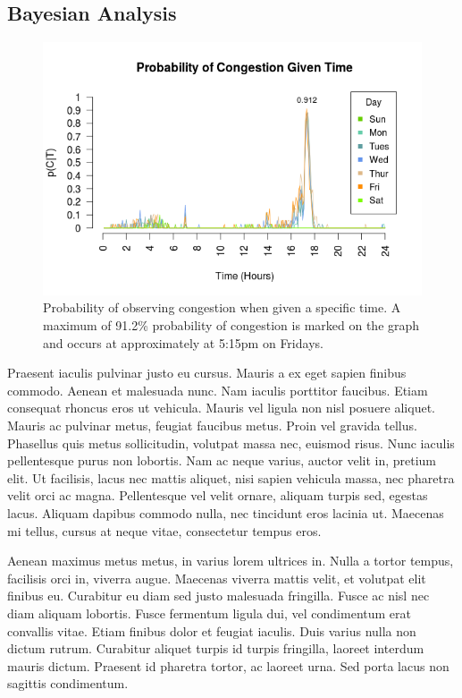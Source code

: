 \documentclass{report}
\begin{document}
\subsection*{Bayesian Analysis}

\begin{figure}
  \centering
	\includegraphics{pCTplot.png}
	\caption{Probability of observing congestion when given a specific time. A maximum of 91.2\% probability of congestion is marked on the graph and occurs at approximately at 5:15pm on Fridays.}
\end{figure}

Praesent iaculis pulvinar justo eu cursus. Mauris a ex eget sapien finibus commodo. Aenean et malesuada nunc. Nam iaculis porttitor faucibus. Etiam consequat rhoncus eros ut vehicula. Mauris vel ligula non nisl posuere aliquet. Mauris ac pulvinar metus, feugiat faucibus metus. Proin vel gravida tellus. Phasellus quis metus sollicitudin, volutpat massa nec, euismod risus. Nunc iaculis pellentesque purus non lobortis. Nam ac neque varius, auctor velit in, pretium elit. Ut facilisis, lacus nec mattis aliquet, nisi sapien vehicula massa, nec pharetra velit orci ac magna. Pellentesque vel velit ornare, aliquam turpis sed, egestas lacus. Aliquam dapibus commodo nulla, nec tincidunt eros lacinia ut. Maecenas mi tellus, cursus at neque vitae, consectetur tempus eros.

Aenean maximus metus metus, in varius lorem ultrices in. Nulla a tortor tempus, facilisis orci in, viverra augue. Maecenas viverra mattis velit, et volutpat elit finibus eu. Curabitur eu diam sed justo malesuada fringilla. Fusce ac nisl nec diam aliquam lobortis. Fusce fermentum ligula dui, vel condimentum erat convallis vitae. Etiam finibus dolor et feugiat iaculis. Duis varius nulla non dictum rutrum. Curabitur aliquet turpis id turpis fringilla, laoreet interdum mauris dictum. Praesent id pharetra tortor, ac laoreet urna. Sed porta lacus non sagittis condimentum.
\end{document}
